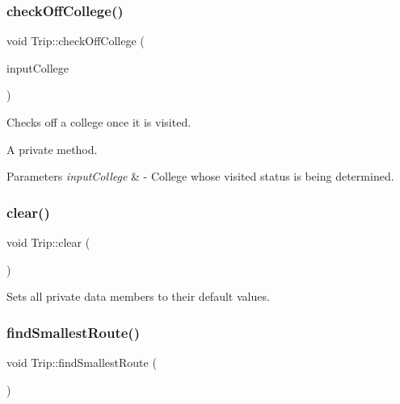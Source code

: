 \subsubsection{\texorpdfstring{check\+Off\+College()}{checkOffCollege()}}
{\footnotesize\ttfamily void Trip\+::check\+Off\+College (\begin{DoxyParamCaption}\item[{Q\+String}]{input\+College }\end{DoxyParamCaption})\hspace{0.3cm}{\ttfamily [private]}}



Checks off a college once it is visited. 

A private method.


\begin{DoxyParams}{Parameters}
{\em input\+College} & -\/ College whose visited status is being determined. \\
\hline
\end{DoxyParams}
\mbox{\label{class_trip_a16ab50d2755e1f61ed8c661d33e19362}} 
\subsubsection{\texorpdfstring{clear()}{clear()}}
{\footnotesize\ttfamily void Trip\+::clear (\begin{DoxyParamCaption}{ }\end{DoxyParamCaption})}



Sets all private data members to their default values. 

\mbox{\label{class_trip_a4af54ea247a8c3fae20f6042743d30e6}} 
\subsubsection{\texorpdfstring{find\+Smallest\+Route()}{findSmallestRoute()}\hspace{0.1cm}{\footnotesize\ttfamily [1/2]}}
{\footnotesize\ttfamily void Trip\+::find\+Smallest\+Route (\begin{DoxyParamCaption}{ }\end{DoxyParamCaption})}



